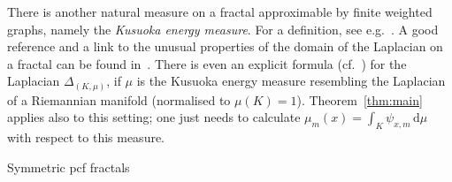\documentclass[12pt,reqno,a4paper]{amsart}            %
\makeatletter
\numberwithin{equation}{section}
\newcommand{\myfont}{\sffamily}
\theoremstyle{mythmstyle}       %
\theoremstyle{mydefstyle}        %
\renewcommand\subsection{\@startsection{subsection}{2}%
  \z@{-.5\linespacing\@plus-.7\linespacing}{.5\linespacing}%
  {\large\myfont\bfseries}}
\newcommand{\Thm}[1]{Theorem~\ref{thm:#1}}
\newcommand{\dd}    {\, \mathrm d}    %
\newcommand{\1}{\mathbbm 1}                    %
\newcommand{\pcf}{pcf\xspace}
\makeatother
\begin{document}
There is another natural measure on a fractal approximable by finite
weighted graphs, namely the \emph{Kusuoka energy measure}.  For a
definition, see e.g.~\cite[Def.~3.4]{teplyaev:08}.  A good reference
and a link to the unusual properties of the domain of the Laplacian on
a fractal can be found in~\cite{bst:99}.  There is even an explicit
formula (cf.~\cite[Thm.~6.1]{teplyaev:08}) for the Laplacian $\Delta_
{(K,\mu)}$, if $\mu$ is the Kusuoka energy measure resembling the
Laplacian of a Riemannian manifold (normalised to
$\mu(K)=1$). \Thm{main} applies also to this setting; one just needs
to calculate $\mu_m(x)=\int_K \psi_{x,m} \dd \mu$ with respect to this
measure.


\subsection{Symmetric \pcf fractals}
\label{ssec:ex.symmetric}
\end{document}
